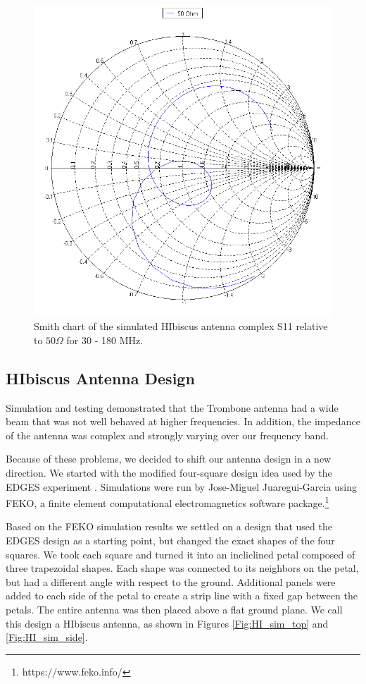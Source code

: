 \begin{figure}[htb]
\begin{minipage}[b]{0.46\textwidth}
\includegraphics[width=0.95\linewidth]{SCIHI_system/figures/HIbiscus_S11_50_Smith.png}
\caption{Smith chart of the simulated HIbiscus antenna complex S11 relative to $50 \Omega$ for 30 - 180 MHz.}
\label{Fig:HIsim_S11_Smith}
\end{minipage}
\end{figure}

\subsection{HIbiscus Antenna Design}

Simulation and testing demonstrated that the Trombone antenna had a wide beam that was not well behaved at higher frequencies. In addition, the impedance of the antenna was complex and strongly varying over our frequency band. 

Because of these problems, we decided to shift our antenna design in a new direction. We started with the modified four-square design idea used by the EDGES experiment \cite{bowman_2008}\cite{rogers_2008}. Simulations were run by Jose-Miguel Juaregui-Garcia using FEKO, a finite element computational electromagnetics software package.\footnote{https://www.feko.info/} 

Based on the FEKO simulation results we settled on a design that used the EDGES design as a starting point, but changed the exact shapes of the four squares. We took each square and turned it into an incliclined petal composed of three trapezoidal shapes. Each shape was connected to its neighbors on the petal, but had a different angle with respect to the ground. Additional panels were added to each side of the petal to create a strip line with a fixed gap between the petals. The entire antenna was then placed above a flat ground plane. We call this design a HIbiscus antenna, as shown in Figures \ref{Fig:HI_sim_top} and \ref{Fig:HI_sim_side}. 


